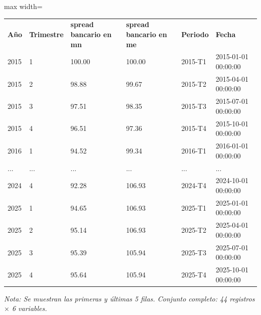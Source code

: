 

\begin{table}[htbp]

\centering

\begin{adjustbox}{max width=\textwidth}

\begin{tabular}{llllll}

\rowcolor{ThemeBackground}
\rule{0pt}{0.45cm}
\textcolor{ThemeGold}{\bfseries Año} & \textcolor{ThemeGold}{\bfseries Trimestre} & \textcolor{ThemeGold}{\bfseries spread bancario en mn} & \textcolor{ThemeGold}{\bfseries spread bancario en me} & \textcolor{ThemeGold}{\bfseries Periodo} & \textcolor{ThemeGold}{\bfseries Fecha} \\

2015 & 1 & 100.00 & 100.00 & 2015-T1 & 2015-01-01 00:00:00 \\
2015 & 2 & 98.88 & 99.67 & 2015-T2 & 2015-04-01 00:00:00 \\
2015 & 3 & 97.51 & 98.35 & 2015-T3 & 2015-07-01 00:00:00 \\
2015 & 4 & 96.51 & 97.36 & 2015-T4 & 2015-10-01 00:00:00 \\
2016 & 1 & 94.52 & 99.34 & 2016-T1 & 2016-01-01 00:00:00 \\
... & ... & ... & ... & ... & ... \\
2024 & 4 & 92.28 & 106.93 & 2024-T4 & 2024-10-01 00:00:00 \\
2025 & 1 & 94.65 & 106.93 & 2025-T1 & 2025-01-01 00:00:00 \\
2025 & 2 & 95.14 & 106.93 & 2025-T2 & 2025-04-01 00:00:00 \\
2025 & 3 & 95.39 & 105.94 & 2025-T3 & 2025-07-01 00:00:00 \\
2025 & 4 & 95.64 & 105.94 & 2025-T4 & 2025-10-01 00:00:00 \\
\bottomrule
\end{tabular}

\end{adjustbox}

\vspace{0.15cm}
{\raggedright\sffamily\footnotesize\color{ThemeMuted}
\textit{Nota: Se muestran las primeras y últimas 5 filas. Conjunto completo: 44 registros $\times$ 6 variables.}}

\end{table}
